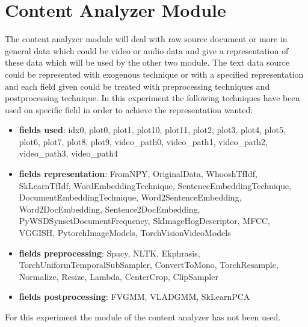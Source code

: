 

\section{Content Analyzer Module}\label{sec:ca}
The content analyzer module will deal with raw source document or more in general data which could be
video or audio data and give a representation of these data which will be used by the other two module.
The text data source could be represented with exogenous technique or with a specified representation
and each field given could be treated with preprocessing techniques and postprocessing technique.
In this experiment the following techniques have been used on specific field in order to achieve the
representation wanted:
\hfill\break
\hfill\break


\begin{itemize}
    \item \textbf{fields used}:  idx0, plot0, plot1, plot10, plot11, plot2, plot3, plot4, plot5, plot6, plot7, plot8, plot9, video\_path0, video\_path1, video\_path2, video\_path3, video\_path4

    \item \textbf{fields representation}:  FromNPY, OriginalData, WhooshTfIdf, SkLearnTfIdf, WordEmbeddingTechnique, SentenceEmbeddingTechnique, DocumentEmbeddingTechnique, Word2SentenceEmbedding, Word2DocEmbedding, Sentence2DocEmbedding, PyWSDSynsetDocumentFrequency, SkImageHogDescriptor, MFCC, VGGISH, PytorchImageModels, TorchVisionVideoModels

    \item \textbf{fields preprocessing}:  Spacy, NLTK, Ekphrasis, TorchUniformTemporalSubSampler, ConvertToMono, TorchResample, Normalize, Resize, Lambda, CenterCrop, ClipSampler

    \item \textbf{fields postprocessing}:  FVGMM, VLADGMM, SkLearnPCA
\end{itemize}


For this experiment the module of the content analyzer has not been used.
\hfill\break
\hfill\break



